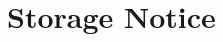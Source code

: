 \documentclass[11pt]{article}
\date{2024-04-04T10:28:43}
\title{}
\begin{document}
\section*{Storage Notice}
\label{sec:org0ce0959}
\end{document}
